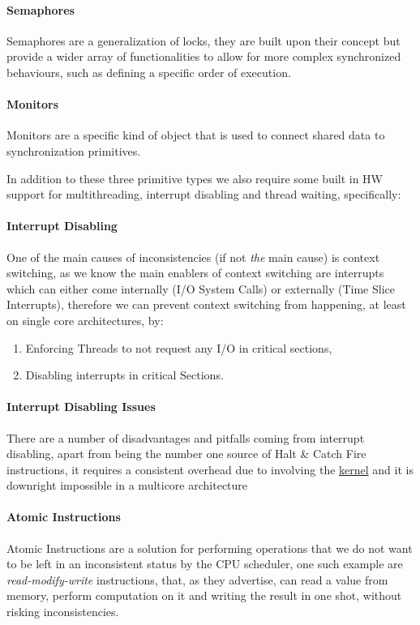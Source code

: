 \documentclass[openright, twoside]{report}
\theoremstyle{definition}
\theoremstyle{example}
\begin{document}
			\paragraph{Semaphores}
			Semaphores are a generalization of locks, they are built upon their concept but 
			provide a wider array of functionalities to allow for more complex synchronized 
			behaviours, such as defining a specific order of execution.

			\paragraph{Monitors}
			Monitors are a specific kind of object that is used to connect shared data to
			synchronization primitives.

		In addition to these three primitive types we also require some built in HW support for 
		multithreading, interrupt disabling and thread waiting, specifically:


		\paragraph{Interrupt Disabling}
		One of the main causes of inconsistencies (if not \emph{the} main cause) is 
		context switching, as we know the main enablers of context switching are interrupts
		which can either come internally (I/O System Calls) or externally (Time Slice 
		Interrupts), therefore we can prevent context switching from happening, at least 
		on single core architectures, by:
		\begin{enumerate}
			\item Enforcing Threads to not request any I/O in critical sections,
			\item Disabling interrupts in critical Sections.
		\end{enumerate}

		\paragraph{Interrupt Disabling Issues}
		There are a number of disadvantages and pitfalls coming from interrupt disabling, 
		apart from being the number one source of Halt \& Catch Fire instructions, it requires 
		a consistent overhead due to involving the 
		\hyperref[par:kernel]{kernel} and it is downright impossible 
		in a multicore architecture 

		\paragraph{Atomic Instructions}
		Atomic Instructions are a solution for performing operations that we do not want
		to be left in an inconsistent status by the CPU scheduler, one such example are
		\emph{read-modify-write} instructions, that, as they advertise, can read a value 
		from memory, perform computation on it and writing the result in one shot, without
		risking inconsistencies.\\ 
\end{document}
